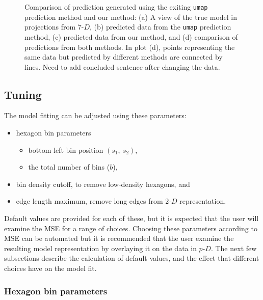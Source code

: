 \documentclass[
  12pt]{article}
\providecommand{\tightlist}{%
  \setlength{\itemsep}{0pt}\setlength{\parskip}{0pt}}\usepackage{longtable,booktabs,array}
\def\tightlist{}
\newcommand\pD{$p\text{-}D$}
\newcommand\gD{$2\text{-}D$}
\begin{document}
\begin{figure}[H]


\caption{\label{fig-predict-scurve}Comparison of prediction generated
using the exiting \texttt{umap} prediction method and our method: (a) A
view of the true model in projections from \(7\text{-}D\), (b) predicted
data from the \texttt{umap} prediction method, (c) predicted data from
our method, and (d) comparison of predictions from both methods. In plot
(d), points representing the same data but predicted by different
methods are connected by lines. Need to add concluded sentence after
changing the data.}

\end{figure}%

\subsection{Tuning}\label{tuning}

The model fitting can be adjusted using these parameters:

\begin{itemize}
\tightlist
\item
  hexagon bin parameters

  \begin{itemize}
  \tightlist
  \item
    bottom left bin position \((s_1, \ s_2)\),
  \item
    the total number of bins (\(b\)),
  \end{itemize}
\item
  bin density cutoff, to remove low-density hexagons, and
\item
  edge length maximum, remove long edges from \gD{} representation.
\end{itemize}

Default values are provided for each of these, but it is expected that
the user will examine the MSE for a range of choices. Choosing these
parameters according to MSE can be automated but it is recommended that
the user examine the resulting model representation by overlaying it on
the data in \pD{}. The next few subsections describe the calculation of
default values, and the effect that different choices have on the model
fit.

\subsubsection{Hexagon bin parameters}\label{hexagon-bin-parameters}
\end{document}
